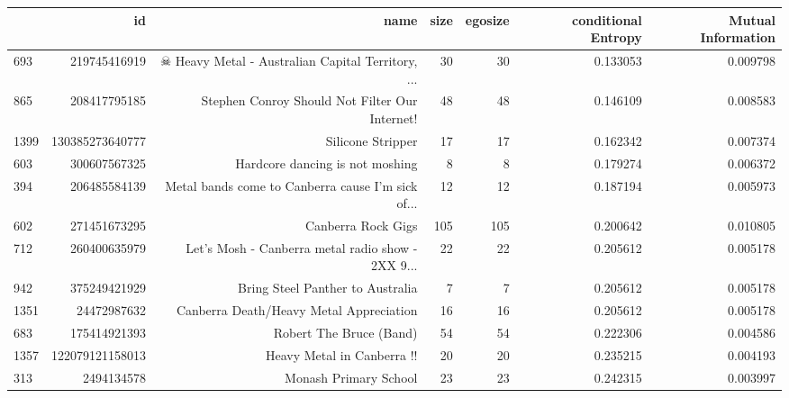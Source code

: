 \cleardoublepage
\begin{table}
\begin{tabular}{| >{\small}l | >{\small}r | >{\small}r | >{\small}r | >{\small}r | >{\small}r |>{\small}r |}
\hline
{} &               id &                                               name &  size &  egosize &  conditional Entropy &  Mutual Information \\
\hline
693  &     219745416919 &  ☠ Heavy Metal - Australian Capital Territory, ... &    30 &       30 &             0.133053 &            0.009798 \\
865  &     208417795185 &     Stephen Conroy Should Not Filter Our Internet! &    48 &       48 &             0.146109 &            0.008583 \\
1399 &  130385273640777 &                                  Silicone Stripper &    17 &       17 &             0.162342 &            0.007374 \\
603  &     300607567325 &                    Hardcore dancing is not moshing &     8 &        8 &             0.179274 &            0.006372 \\
394  &     206485584139 &  Metal bands come to Canberra cause I'm sick of... &    12 &       12 &             0.187194 &            0.005973 \\
602  &     271451673295 &                                 Canberra Rock Gigs &   105 &      105 &             0.200642 &            0.010805 \\
712  &     260400635979 &  Let's Mosh - Canberra metal radio show - 2XX 9... &    22 &       22 &             0.205612 &            0.005178 \\
942  &     375249421929 &                   Bring Steel Panther to Australia &     7 &        7 &             0.205612 &            0.005178 \\
1351 &      24472987632 &            Canberra Death/Heavy Metal Appreciation &    16 &       16 &             0.205612 &            0.005178 \\
683  &     175414921393 &                            Robert The Bruce (Band) &    54 &       54 &             0.222306 &            0.004586 \\
1357 &  122079121158013 &                         Heavy Metal in Canberra !! &    20 &       20 &             0.235215 &            0.004193 \\
313  &       2494134578 &                              Monash Primary School &    23 &       23 &             0.242315 &            0.003997 \\

\end{tabular}
\end{table}
